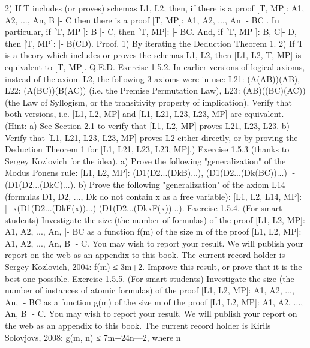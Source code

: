 2) If T includes (or proves) schemas L1, L2, then, if there is a proof [T, MP]: A1, A2, ..., An, B |- C then
there is a proof [T, MP]: A1, A2, ..., An |- B\IMPLIES C .
In particular, if [T, MP ]: B |- C, then [T, MP]: |- B\IMPLIES C.
And, if [T, MP ]: B, C|- D, then [T, MP]: |- B\IMPLIES (C\IMPLIES D).
Proof. 1) By iterating the Deduction Theorem 1.
2) If T is a theory which includes or proves the schemas L1, L2, then [L1, L2, T, MP] is equivalent to [T,
MP]. Q.E.D.
Exercise 1.5.2. In earlier versions of logical axioms, instead of the axiom L2, the following 3 axioms
were in use:
L21: (A\IMPLIES (A\IMPLIES B))\IMPLIES (A\IMPLIES B),
L22: (A\IMPLIES (B\IMPLIES C))\IMPLIES (B\IMPLIES (A\IMPLIES C)) (i.e. the Premise Permutation Law),
L23: (A\IMPLIES B)\IMPLIES ((B\IMPLIES C)\IMPLIES (A\IMPLIES C)) (the Law of Syllogism, or the transitivity property of implication).
Verify that both versions, i.e. [L1, L2, MP] and [L1, L21, L23, L23, MP] are equivalent. (Hint: a) See
Section 2.1 to verify that [L1, L2, MP] proves L21, L23, L23. b) Verify that [L1, L21, L23, L23, MP] proves
L2 either directly, or by proving the Deduction Theorem 1 for [L1, L21, L23, L23, MP].)
Exercise 1.5.3 (thanks to Sergey Kozlovich for the idea).
a) Prove the following "generalization" of the Modus Ponens rule:
[L1, L2, MP]: (D1\IMPLIES (D2\IMPLIES ...(Dk\IMPLIES B)...), (D1\IMPLIES (D2\IMPLIES ...(Dk\IMPLIES (B\IMPLIES C))...) |- (D1\IMPLIES (D2\IMPLIES ...(Dk\IMPLIES C)...).
b) Prove the following "generalization" of the axiom L14 (formulas D1, D2, ..., Dk do not contain x as a
free variable):
[L1, L2, L14, MP]: |- \forall x(D1\IMPLIES (D2\IMPLIES ...(Dk\IMPLIES F(x))...) \IMPLIES  (D1\IMPLIES (D2\IMPLIES ...(Dk\IMPLIES \forall xF(x))...).
Exercise 1.5.4. (For smart students) Investigate the size (the number of formulas) of the proof [L1, L2,
MP]: A1, A2, ..., An, |- B\IMPLIES C as a function f(m) of the size m of the proof [L1, L2, MP]: A1, A2, ..., An, B |-
C. You may wish to report your result. We will publish your report on the web as an appendix to this
book. The current record holder is Sergey Kozlovich, 2004: f(m) ≤ 3m+2. Improve this result, or prove
that it is the best one possible.
Exercise 1.5.5. (For smart students) Investigate the size (the number of instances of atomic formulas) of
the proof [L1, L2, MP]: A1, A2, ..., An, |- B\IMPLIES C as a function g(m) of the size m of the proof [L1, L2, MP]:
A1, A2, ..., An, B |- C. You may wish to report your result. We will publish your report on the web as an
appendix to this book. The current record holder is Kirils Solovjovs, 2008: g(m, n) ≤ 7m+24n---2, where n
